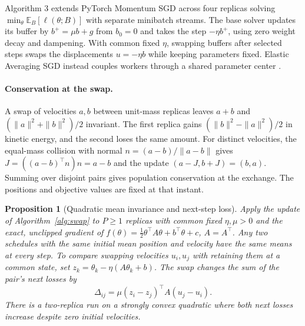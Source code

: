 \documentclass[10pt,letterpaper]{article}
\newtheorem{proposition}{Proposition}
\begin{document}
Algorithm 3 extends PyTorch Momentum SGD \cite{pytorchsgd} across four replicas solving \(\min_\theta \mathbb E_B[\ell(\theta;B)]\) with separate minibatch streams. The base solver updates its buffer by \(b^+=\mu b+g\) from \(b_0=0\) and takes the step \(-\eta b^+\), using zero weight decay and dampening. With common fixed \(\eta\), swapping buffers after selected steps swaps the displacements \(u=-\eta b\) while keeping parameters fixed. Elastic Averaging SGD instead couples workers through a shared parameter center \cite[Eqs.~2--4]{easgd}.


\paragraph{Conservation at the swap.}
A swap of velocities \(a,b\) between unit-mass replicas leaves \(a+b\) and \((\|a\|^2+\|b\|^2)/2\) invariant. The first replica gains \((\|b\|^2-\|a\|^2)/2\) in kinetic energy, and the second loses the same amount. For distinct velocities, the equal-mass collision with normal \(n=(a-b)/\|a-b\|\) gives \(J=((a-b)^\top n)n=a-b\) and the update \((a-J,b+J)=(b,a)\). Summing over disjoint pairs gives population conservation at the exchange. The positions and objective values are fixed at that instant.

\begin{proposition}[Quadratic mean invariance and next-step loss]\label{prop:quadratic-exchange}
Apply the update of Algorithm~\ref{alg:swap} to \(P\ge1\) replicas with common fixed \(\eta,\mu>0\) and the exact, unclipped gradient of \(f(\theta)=\tfrac12\theta^\top A\theta+b^\top\theta+c\), \(A=A^\top\). Any two schedules with the same initial mean position and velocity have the same means at every step. To compare swapping velocities \(u_i,u_j\) with retaining them at a common state, set \(z_k=\theta_k-\eta(A\theta_k+b)\). The swap changes the sum of the pair's next losses by
\[
 \Delta_{ij}=\mu(z_i-z_j)^\top A(u_j-u_i).
\]
There is a two-replica run on a strongly convex quadratic where both next losses increase despite zero initial velocities.
\end{proposition}
\end{document}
